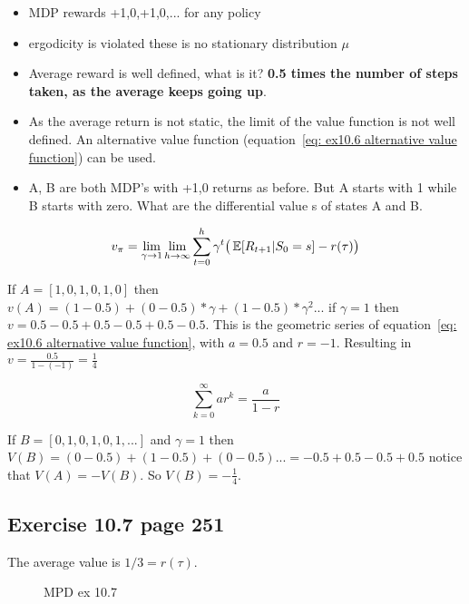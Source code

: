 \begin{itemize}
	\item MDP rewards +1,0,+1,0,... for any policy
	\item ergodicity is violated these is no stationary distribution $\mu$ 
	\item Average reward is well defined, what is it? \textbf{0.5 times the number of steps taken, as the average keeps going up}.
	\item As the average return is not static, the limit of the value function is not well defined. An alternative value function (equation~\ref{eq: ex10.6 alternative value function}) can be used. 
	\item A, B are both MDP's with +1,0 returns as before. But A starts with 1 while B starts with zero. What are the differential value s of states A and B.
\end{itemize}

\begin{equation}
v_{\pi} = \lim_{\gamma \rightarrow 1} \lim_{h \rightarrow \infty} \sum_{t=0}^h \gamma^t \big( \operatorname{\mathbb{E}}[R_{t+1} | S_0=s] - r(\tau) \big)
\label{eq: ex10.6 alternative value function}
\end{equation}

If $A = [1, 0, 1, 0, 1, 0 ]$ then $v(A)=(1-0.5)+(0-0.5)*\gamma+(1-0.5)*\gamma^2...$ if $\gamma=1$ then $v=0.5 - 0.5 + 0.5 - 0.5 + 0.5 - 0.5$. This is the geometric series of equation~\ref{eq: ex10.6 alternative value function}, with $a = 0.5$ and $r = -1$. Resulting in $v=\frac{0.5}{1-(-1)}=\frac{1}{4}$

\begin{equation}
\sum_{k=0}^\infty ar^k = \frac{a}{1-r} 
\label{eq:ex 10.6 geometric series}
\end{equation}

If $B = [0, 1, 0, 1, 0, 1, ... ]$ and $\gamma=1$ then $V(B) = (0-0.5) + (1-0.5) + (0-0.5)... = -0.5 + 0.5 -0.5 + 0.5$ notice that $V(A) = -V(B)$. So $V(B) = -\frac{1}{4}$.

\subsection{Exercise 10.7 page 251}
The average value is $1/3=r(\tau)$.

\begin{figure}
	\centering
	\caption{MPD ex 10.7}
	\label{fig:mdp ex 10.7}
\end{figure}


